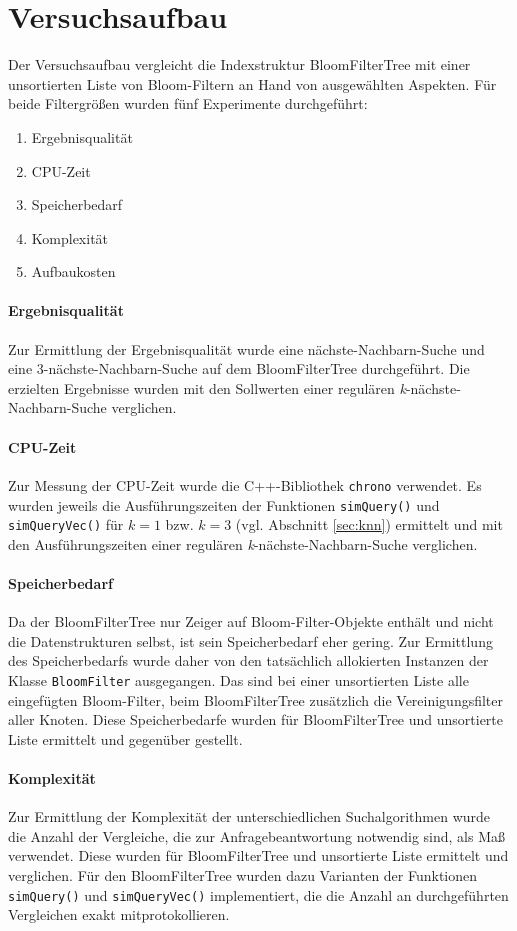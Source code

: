 \section{Versuchsaufbau}\label{sec:versuchsaufbau}
Der Versuchsaufbau vergleicht die Indexstruktur BloomFilterTree mit einer unsortierten Liste von Bloom-Filtern an Hand von ausgewählten Aspekten. Für beide Filtergrößen wurden fünf Experimente durchgeführt:  
\begin{enumerate}
\setlength{\itemsep}{20pt}
	\item Ergebnisqualität
	\item CPU-Zeit 
	\item Speicherbedarf 
	\item Komplexität 
	\item Aufbaukosten 
\end{enumerate}
\paragraph*{Ergebnisqualität}
Zur Ermittlung der Ergebnisqualität wurde eine nächste-Nachbarn-Suche und eine 3-nächste-Nachbarn-Suche auf dem BloomFilterTree durchgeführt. Die erzielten Ergebnisse wurden mit den Sollwerten einer regulären \textit{k}-nächste-Nachbarn-Suche verglichen. 
\paragraph*{CPU-Zeit}
Zur Messung der CPU-Zeit wurde die C++-Bibliothek \texttt{chrono} verwendet. Es wurden jeweils die Ausführungszeiten der Funktionen \texttt{simQuery()} und \texttt{simQueryVec()} für $k=1$ bzw. $k=3$ (vgl. Abschnitt \ref{sec:knn}) ermittelt und mit den Ausführungszeiten einer regulären \textit{k}-nächste-Nachbarn-Suche verglichen.
\paragraph*{Speicherbedarf} 
Da der BloomFilterTree nur Zeiger auf Bloom-Filter-Objekte enthält und nicht die Datenstrukturen selbst, ist sein Speicherbedarf eher gering. Zur Ermittlung des Speicherbedarfs wurde daher von den tatsächlich allokierten Instanzen der Klasse \texttt{BloomFilter} ausgegangen. Das sind bei einer unsortierten Liste alle eingefügten Bloom-Filter, beim BloomFilterTree zusätzlich die Vereinigungsfilter aller Knoten. Diese Speicherbedarfe wurden für BloomFilterTree und unsortierte Liste ermittelt und gegenüber gestellt. 
\paragraph*{Komplexität}
Zur Ermittlung der Komplexität der unterschiedlichen Suchalgorithmen wurde die Anzahl der Vergleiche, die zur Anfragebeantwortung notwendig sind, als Maß verwendet. Diese wurden für BloomFilterTree und unsortierte Liste ermittelt und verglichen. Für den BloomFilterTree wurden dazu Varianten der Funktionen \texttt{simQuery()} und \texttt{simQueryVec()} implementiert, die die Anzahl an durchgeführten Vergleichen exakt mitprotokollieren.   

